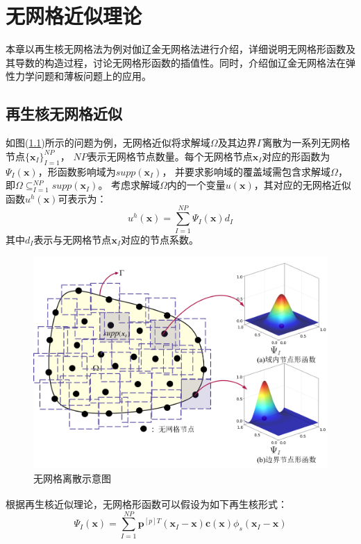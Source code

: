 \chapter{无网格近似理论}
本章以再生核无网格法为例对伽辽金无网格法进行介绍，详细说明无网格形函数及其导数的构造过程，讨论无网格形函数的插值性。同时，介绍伽辽金无网格法在弹性力学问题和薄板问题上的应用。
\section{再生核无网格近似}
如图(\ref{nomeshpoint})所示的问题为例，无网格近似将求解域$\Omega$及其边界$\Gamma$离散为一系列无网格节点$\{\pmb{x}_I\}^{N\!P}_{I=1}$，
$N\!P$表示无网格节点数量。每个无网格节点$\pmb{x}_I$对应的形函数为$\Psi_I(\pmb{x})$，形函数影响域为$supp(\pmb{x}_I)$，
并要求影响域的覆盖域需包含求解域$\Omega$，即$\Omega\subseteq^{N\!P}_{I=1}supp(\pmb{x}_I)$。
考虑求解域$\Omega$内的一个变量$u(\pmb{x})$，其对应的无网格近似函数$u^h(\pmb{x})$可表示为：
\begin{equation}\label{ui}
    u^h(\pmb{x})=\sum_{I=1}^{N\!P}\Psi_I(\pmb{x})d_{I}
\end{equation}
其中$d_{I}$表示与无网格节点$\pmb{x}_I$对应的节点系数。\par
\begin{figure}[H]
\centering
    \includegraphics[scale=0.6]{Figure/nomesh/point.png}
    \caption{无网格离散示意图}\label{nomeshpoint}
\end{figure}\par
根据再生核近似理论\textsuperscript{\cite{liuReproducingKernelParticle1995}}，无网格形函数可以假设为如下再生核形式：
\begin{equation}\label{shapefunction}
        \Psi_I(\pmb{x})=\sum_{I=1}^{N\!P}\pmb{p}^{[p]T}(\pmb{x}_I-\pmb{x})\pmb{c}(\pmb{x})\phi_s(\pmb{x}_I-\pmb{x})
\end{equation}
